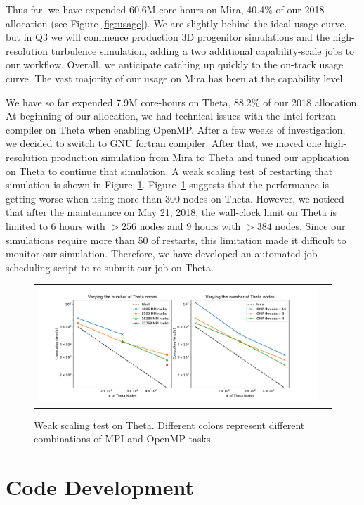 \documentclass[12pt]{article}
\begin{document}
Thus far, we have expended 60.6M core-hours on Mira, 40.4\% of our 2018 allocation (see Figure \ref{fig:usage}).
We are slightly behind the ideal usage curve, but in Q3 we will commence production 3D progenitor simulations and the high-resolution turbulence simulation, adding a two additional capability-scale jobs to our workflow.
Overall, we anticipate catching up quickly to the on-track usage curve.
The vast majority of our usage on Mira has been at the capability level.


We have so far expended 7.9M core-hours on Theta, 88.2\% of our 2018 allocation. 
At beginning of our allocation, we had technical issues with the Intel fortran compiler on Theta when enabling OpenMP.
After a few weeks of investigation, we decided to switch to GNU fortran compiler.    
After that, we moved one high-resolution production simulation from Mira to Theta 
and tuned our application on Theta to continue that simulation. 
A weak scaling test of restarting that simulation is shown in Figure~\ref{fig:theta}.
Figure~\ref{fig:theta} suggests that the performance is getting worse when using more than 300 nodes on Theta.
However, we noticed that after the maintenance on May 21, 2018, the wall-clock limit on Theta is limited to 6 hours 
with $> 256$ nodes and 9 hours with $> 384$ nodes.
Since our simulations require more than 50 of restarts, this limitation made it difficult to monitor our simulation.
Therefore, we have developed an automated job scheduling script to re-submit our job on Theta.    
    

\begin{figure}
  \begin{tabular}{cc} 
    \includegraphics[width=6.5in]{fig_theta_scaling_j4.pdf}
  \end{tabular}
  \caption{Weak scaling test on Theta. Different colors represent different combinations of MPI and OpenMP tasks. }
  \label{fig:theta}
\end{figure}

\section{Code Development}
\end{document}
